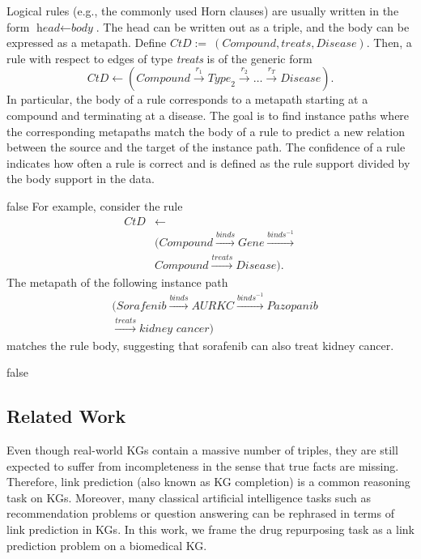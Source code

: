 \documentclass{article}
\begin{document}
Logical rules (e.g., the commonly used Horn clauses) 
are usually written in the form $\textit{head} \leftarrow \textit{body}$. 
The head can be written out as a triple, and the body can be expressed as a metapath. Define $\textit{CtD} :=~(\textit{Compound}, \textit{treats}, \textit{Disease})$.
Then, a rule with respect to edges of type \textit{treats} is of the generic form
$$ \textit{CtD}  \leftarrow \left(\textit{Compound} \xrightarrow{r_1} \textit{Type}_2 \xrightarrow{r_2} \dots \xrightarrow{r_T} \textit{Disease} \right).
$$
In particular, the body of a rule corresponds to a metapath starting at a compound and terminating at a disease. The goal is to find instance paths where the corresponding metapaths match the body of a rule to predict a new relation between the source and the target of the instance path. The confidence of a rule indicates how often a rule is correct and is defined as the rule support divided by the body support in the data. 

\if false
For example, consider the rule
\begin{align*}
\textit{CtD} &\leftarrow \\ &(\textit{Compound} \xrightarrow{\textit{binds}} \textit{Gene} \xrightarrow{\textit{binds}^{-1}} \\& \textit{Compound} \xrightarrow{\textit{treats}} \textit{Disease}).
\end{align*}
The metapath of the following instance path
\begin{align*}
&(\textit{Sorafenib} \xrightarrow{\textit{binds}} \textit{AURKC} \xrightarrow{\textit{binds}^{-1}} \textit{Pazopanib} \\ &\xrightarrow{\textit{treats}} \textit{kidney cancer})
\end{align*}
matches the rule body, suggesting that sorafenib can also treat kidney cancer. %
\fi

\if false
\subsection{Related Work}
Even though real-world KGs contain a massive number of triples, they are still expected to suffer from incompleteness in the sense that true facts are missing. Therefore, link prediction (also known as KG completion) is a common reasoning task on KGs. Moreover, many classical artificial intelligence tasks such as  recommendation problems or question answering can be rephrased in terms of link prediction in KGs. In this work, we frame the drug repurposing task as a link prediction problem on a biomedical KG. 
\end{document}
